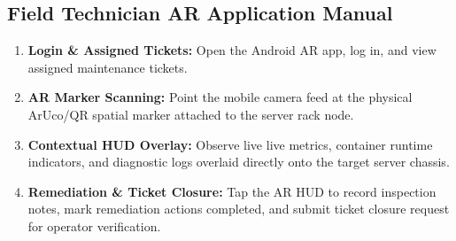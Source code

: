 \subsection{Field Technician AR Application Manual}
\begin{enumerate}
    \item \textbf{Login \& Assigned Tickets:} Open the Android AR app, log in, and view assigned maintenance tickets.
    \item \textbf{AR Marker Scanning:} Point the mobile camera feed at the physical ArUco/QR spatial marker attached to the server rack node.
    \item \textbf{Contextual HUD Overlay:} Observe live live metrics, container runtime indicators, and diagnostic logs overlaid directly onto the target server chassis.
    \item \textbf{Remediation \& Ticket Closure:} Tap the AR HUD to record inspection notes, mark remediation actions completed, and submit ticket closure request for operator verification.
\end{enumerate}

